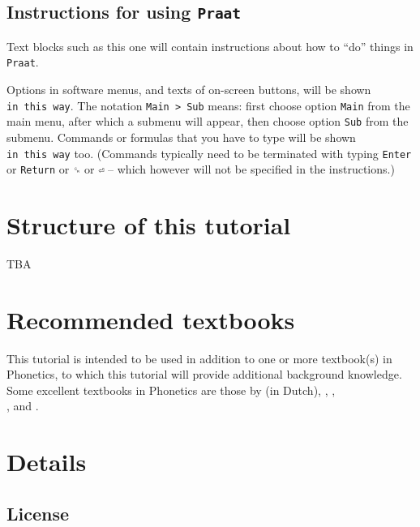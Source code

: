 \documentclass[
]{book}
\begin{document}
\label{tech-layout}
\subsection*{\texorpdfstring{Instructions for using \texttt{Praat}}{Instructions for using Praat}}\label{instructions-for-using-praat}

Text blocks such as this one will contain instructions about how to ``do'' things in \texttt{Praat}.

Options in software menus, and texts of on-screen buttons, will be shown \texttt{in\ this\ way}.
The notation \texttt{Main\ \textgreater{}\ Sub} means: first choose option \texttt{Main} from the main menu, after which a submenu will appear, then choose option \texttt{Sub} from the submenu.
Commands or formulas that you have to type will be shown \texttt{in\ this\ way} too. (Commands typically need to be terminated with typing \texttt{Enter} or \texttt{Return} or \texttt{␍} or \texttt{⏎} -- which however will not be specified in the instructions.)

\section*{Structure of this tutorial}\label{structure-of-this-tutorial}

TBA

\section*{Recommended textbooks}\label{recommended-textbooks}

This tutorial is intended to be used in addition to one or more textbook(s) in Phonetics, to which this tutorial will provide additional background knowledge. Some excellent textbooks in Phonetics are those by
\citet{Rietveld_VanHeuven_2009} (in Dutch),
\citet{Johnson_2011},
\citet{Ladefoged_Johnson_2015},\\
\citet{Reetz_Jongman_2020}, and
\citet{Zsiga_2024}.

\section*{Details}\label{details}

\subsection*{License}\label{license}
\end{document}
